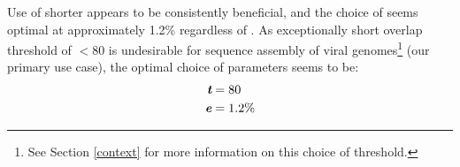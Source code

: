 Use of shorter  appears to be consistently beneficial, and the choice of  seems optimal at approximately 1.2\% regardless of . As exceptionally short overlap threshold of $< 80$ is undesirable for sequence assembly of viral genomes\footnote{See Section \ref{context} for more information on this choice of threshold.} (our primary use case), the optimal choice of parameters seems to be:
\begin{align*}
\textit{\textbf{t}} &= 80\\
\textit{\textbf{e}} &= 1.2\%
\end{align*}

\FloatBarrier

